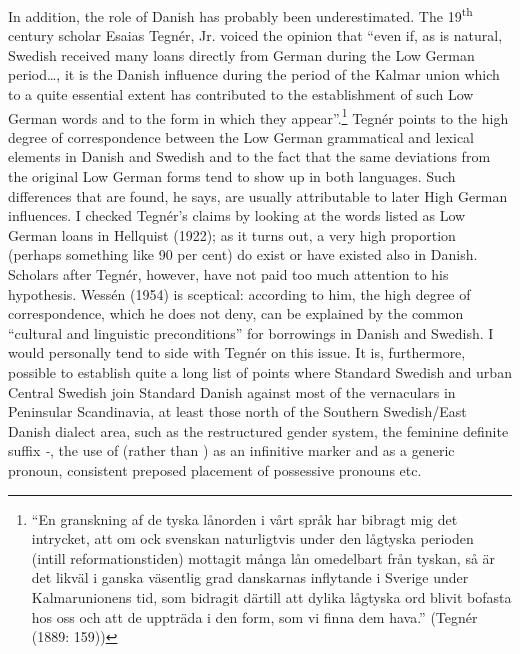 In addition, the role of Danish has probably been underestimated. The 19\textsuperscript{th} century scholar Esaias Tegnér, Jr. voiced the opinion that “even if, as is natural, Swedish received many loans directly from German during the Low German period…, it is the Danish influence during the period of the Kalmar union which to a quite essential extent has contributed to the establishment of such Low German words and to the form in which they appear”.\footnote{ “En granskning af de tyska lånorden i vårt språk har bibragt mig det intrycket, att om ock svenskan naturligtvis under den lågtyska perioden (intill reformationstiden) mottagit många lån omedelbart från tyskan, så är det likväl i ganska väsentlig grad danskarnas inflytande i Sverige under Kalmarunionens tid, som bidragit därtill att dylika lågtyska ord blivit bofasta hos oss och att de uppträda i den form, som vi finna dem hava.” (Tegnér (1889: 159))} Tegnér points to the high degree of correspondence between the Low German grammatical and lexical elements in Danish and Swedish and to the fact that the same deviations from the original Low German forms tend to show up in both languages. Such differences that are found, he says, are usually attributable to later High German influences. I checked Tegnér’s claims by looking at the words listed as Low German loans in Hellquist (1922); as it turns out, a very high proportion (perhaps something like 90 per cent) do exist or have existed also in Danish. Scholars after Tegnér, however, have not paid too much attention to his hypothesis. Wessén (1954) is sceptical: according to him, the high degree of correspondence, which he does not deny, can be explained by the common “cultural and linguistic preconditions” for borrowings in Danish and Swedish. I would personally tend to side with Tegnér on this issue. It is, furthermore, possible to establish quite a long list of points where Standard Swedish and urban Central Swedish join Standard Danish against most of the vernaculars in Peninsular Scandinavia, at least those north of the Southern Swedish/East Danish dialect area, such as the restructured gender system, the feminine definite suffix\textit{ {}-}, the use of  (rather than ) as an infinitive marker and  as a generic pronoun, consistent preposed placement of possessive pronouns etc. 

